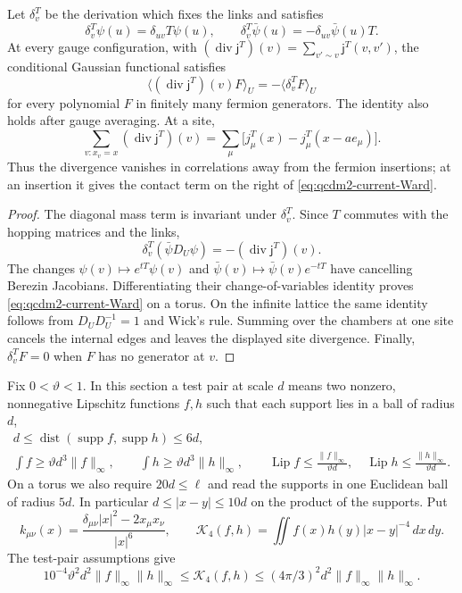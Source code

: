 \documentclass[11pt,letterpaper,reqno]{amsart}
\makeatletter
\theoremstyle{definition}
\newcommand{\ms@minorstart}{%
  \pushQED{\qed}\renewcommand{\qedsymbol}{$\blacksquare$}}
\newenvironment{proposition}[1][]{\ms@minorstart\ms@proposition[#1]}
  {\popQED\endms@proposition}
\theoremstyle{remark}
\makeatother
\begin{document}
\begin{proposition}[Lattice conservation]\label{prop:qcdm2-current-Ward}
Let $\delta_v^T$ be the derivation which fixes the links and
satisfies
\[
 \delta_v^T\psi(u)=\delta_{uv}T\psi(u),\qquad
 \delta_v^T\bar\psi(u)=-\delta_{uv}\bar\psi(u)T.
\]
At every gauge configuration, with
$(\operatorname{div}\mathsf j^T)(v)=\sum_{v'\sim v}\mathsf j^T(v,v')$,
the conditional Gaussian functional satisfies
\begin{equation}\label{eq:qcdm2-current-Ward}
 \langle(\operatorname{div}\mathsf j^T)(v)F\rangle_U
 =-\langle\delta_v^TF\rangle_U
\end{equation}
for every polynomial $F$ in finitely many fermion generators.
The identity also holds after gauge averaging. At a site,
\[
 \sum_{v:x_v=x}(\operatorname{div}\mathsf j^T)(v)
 =\sum_\mu\bigl[j^T_\mu(x)-j^T_\mu(x-ae_\mu)\bigr].
\]
Thus the divergence vanishes in correlations away from the
fermion insertions; at an insertion it gives the contact
term on the right of \eqref{eq:qcdm2-current-Ward}.
\end{proposition}

\begin{proof}
The diagonal mass term is invariant under $\delta_v^T$.
Since $T$ commutes with the hopping matrices and the links,
\[
 \delta_v^T(\bar\psi D_U\psi)
 =-(\operatorname{div}\mathsf j^T)(v).
\]
The changes $\psi(v)\mapsto e^{tT}\psi(v)$ and
$\bar\psi(v)\mapsto\bar\psi(v)e^{-tT}$ have cancelling
Berezin Jacobians. Differentiating their change-of-variables
identity proves \eqref{eq:qcdm2-current-Ward} on a torus.
On the infinite lattice the same identity follows from
$D_UD_U^{-1}=1$ and Wick's rule. Summing over the chambers
at one site cancels the internal edges and leaves the
displayed site divergence. Finally, $\delta_v^TF=0$ when
$F$ has no generator at $v$.
\end{proof}

Fix $0<\vartheta<1$.  In this section a test pair at scale $d$
means two nonzero, nonnegative Lipschitz functions $f,h$ such that
each support lies in a ball of radius $d$,
\begin{equation}\label{eq:qcdm2-current-test-pair}
 \begin{gathered}
 d\le\operatorname{dist}(\operatorname{supp}f,
                         \operatorname{supp}h)\le6d,\\
 \int f\ge\vartheta d^3\|f\|_\infty,\qquad
 \int h\ge\vartheta d^3\|h\|_\infty,\qquad
 \operatorname{Lip}f\le\frac{\|f\|_\infty}{\vartheta d},
 \quad
 \operatorname{Lip}h\le\frac{\|h\|_\infty}{\vartheta d}.
 \end{gathered}
\end{equation}
On a torus we also require $20d\le\ell$ and read the supports in
one Euclidean ball of radius $5d$.  In particular
$d\le|x-y|\le10d$ on the product of the supports.  Put
\[
 k_{\mu\nu}(x)=\frac{\delta_{\mu\nu}|x|^2-2x_\mu x_\nu}{|x|^6},
 \qquad
 \mathcal K_4(f,h)=\iint f(x)h(y)|x-y|^{-4}\,dx\,dy.
\]
The test-pair assumptions give
\begin{equation}\label{eq:qcdm2-current-Klower}
 10^{-4}\vartheta^2d^2\|f\|_\infty\|h\|_\infty
       \le\mathcal K_4(f,h)
       \le(4\pi/3)^2d^2\|f\|_\infty\|h\|_\infty.
\end{equation}
\end{document}
